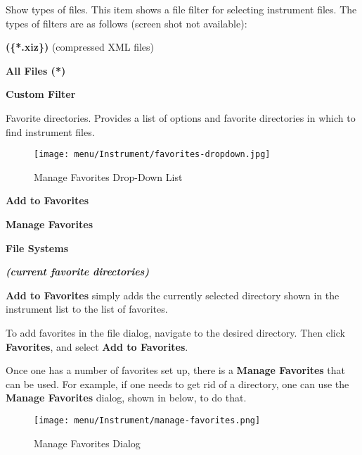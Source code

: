    Show types of files.
   This item shows a file filter for selecting instrument files.
   The types of filters are as follows (screen shot not available):

   \begin{enumber}
      \item \textbf{(\{*.xiz\})} (compressed XML files)
      \item \textbf{All Files (*)}
      \item \textbf{Custom Filter}
   \end{enumber}

   Favorite directories.
   Provides a list of options and favorite directories in which to find
   instrument files.

\begin{figure}[H]
   \centering
   \texttt{[image: menu/Instrument/favorites-dropdown.jpg]}
   \caption{Manage Favorites Drop-Down List}
   \label{fig:open_instrument_favorites}
\end{figure}

   \begin{enumber}
      \item \textbf{Add to Favorites}
      \item \textbf{Manage Favorites}
      \item \textbf{File Systems}
      \item \textbf{\textsl{(current favorite directories)}}
   \end{enumber}

   \textbf{Add to Favorites}
   simply adds the currently selected directory shown in the instrument list
   to the list of favorites.

   To add favorites in the file dialog, navigate to the desired directory.
   Then click \textbf{Favorites}, and select \textbf{Add to Favorites}.

   Once one has a number of favorites set up,
   there is a \textbf{Manage Favorites} that can be used.
   For example, if one needs to get rid of a directory, one can use the
   \textbf{Manage Favorites}
   dialog, shown in
    below,
   to do that.

\begin{figure}[H]
   \centering
   \texttt{[image: menu/Instrument/manage-favorites.png]}
   \caption{Manage Favorites Dialog}
   \label{fig:manage_instrument_favorites}
\end{figure}

